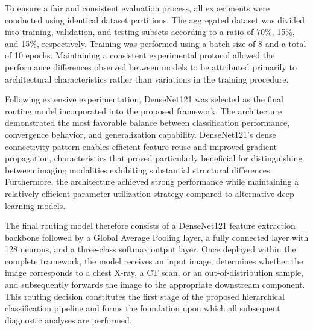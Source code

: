 To ensure a fair and consistent evaluation process, all experiments were conducted using identical dataset partitions. The aggregated dataset was divided into training, validation, and testing subsets according to a ratio of 70\%, 15\%, and 15\%, respectively. Training was performed using a batch size of 8 and a total of 10 epochs. Maintaining a consistent experimental protocol allowed the performance differences observed between models to be attributed primarily to architectural characteristics rather than variations in the training procedure.

Following extensive experimentation, DenseNet121 was selected as the final routing model incorporated into the proposed framework. The architecture demonstrated the most favorable balance between classification performance, convergence behavior, and generalization capability. DenseNet121's dense connectivity pattern enables efficient feature reuse and improved gradient propagation, characteristics that proved particularly beneficial for distinguishing between imaging modalities exhibiting substantial structural differences. Furthermore, the architecture achieved strong performance while maintaining a relatively efficient parameter utilization strategy compared to alternative deep learning models.

The final routing model therefore consists of a DenseNet121 feature extraction backbone followed by a Global Average Pooling layer, a fully connected layer with 128 neurons, and a three-class softmax output layer. Once deployed within the complete framework, the model receives an input image, determines whether the image corresponds to a chest X-ray, a CT scan, or an out-of-distribution sample, and subsequently forwards the image to the appropriate downstream component. This routing decision constitutes the first stage of the proposed hierarchical classification pipeline and forms the foundation upon which all subsequent diagnostic analyses are performed.
